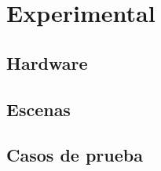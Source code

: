 \chapter{Experimental}
\label{ch:chap05}

\section{Hardware}
\label{sec:hardware}

\section{Escenas}
\label{sec:escenas}

\section{Casos de prueba}
\label{sec:pruebas}
